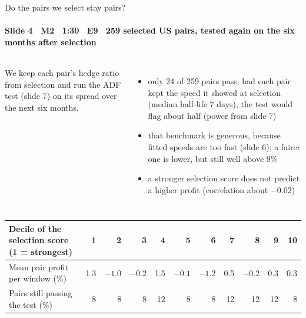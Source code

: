 \begin{frame}{Do the pairs we select stay pairs?}
\framesubtitle{Slide 4 \textbullet\ M2 \textbullet\ 1:30 \textbullet\ E9 \textbullet\ 259 selected US pairs, tested again on the six months after selection}
\vspace{-2pt}
\begin{columns}[T,onlytextwidth]
  \footnotesize\raggedright
  We keep each pair's hedge ratio from selection and run the ADF test (slide 7) on its spread over the next six months.\\[4pt]
  \centering
  \footnotesize\raggedright
  \begin{itemize}\setlength{\itemsep}{1pt}
    \item only 24 of 259 pairs pass; had each pair kept the speed it showed at selection (median half-life 7 days), the test would flag about half (power from slide 7)
    \item that benchmark is generous, because fitted speeds are too fast (slide 6); a fairer one is lower, but still well above 9\%
    \item a stronger selection score does not predict a higher profit (correlation about $-0.02$)
  \end{itemize}
\end{columns}
\vspace{4pt}
\centering\scriptsize\setlength{\tabcolsep}{3.5pt}
\begin{tabular}{@{}l*{10}{r}@{}}
  \toprule
  Decile of the selection score (1 = strongest) & 1 & 2 & 3 & 4 & 5 & 6 & 7 & 8 & 9 & 10 \\
  \midrule
  Mean pair profit per window (\%) & 1.3 & $-1.0$ & $-0.2$ & 1.5 & $-0.1$ & $-1.2$ & 0.5 & $-0.2$ & 0.3 & 0.3 \\
  Pairs still passing the test (\%) & 8 & 8 & 8 & 12 & 8 & 8 & 12 & 12 & 12 & 8 \\
  \bottomrule
\end{tabular}
\end{frame}
